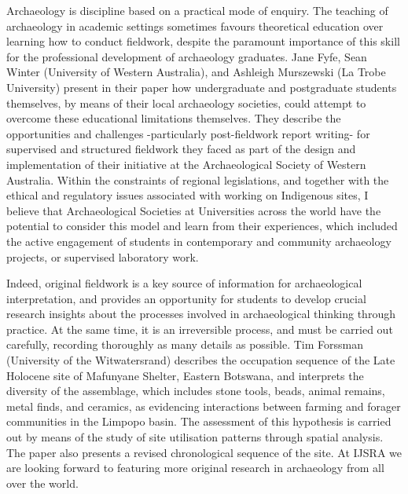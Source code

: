 Archaeology is discipline based on a practical mode of enquiry. The teaching of archaeology in academic settings sometimes favours theoretical education over learning how to conduct fieldwork, despite the paramount importance of this skill for the professional development of archaeology graduates. Jane Fyfe, Sean Winter (University of Western Australia), and Ashleigh Murszewski (La Trobe University) present in their paper how undergraduate and postgraduate students themselves, by means of their local archaeology societies, could attempt to overcome these educational limitations themselves. They describe the opportunities and challenges -particularly post-fieldwork report writing- for supervised and structured fieldwork they faced as part of the design and implementation of their initiative at the Archaeological Society of Western Australia. Within the constraints of regional legislations, and together with the ethical and regulatory issues associated with working on Indigenous sites, I believe that Archaeological Societies at Universities across the world have the potential to consider this model and learn from their experiences, which included the active engagement of students in contemporary and community archaeology projects, or supervised laboratory work.

Indeed, original fieldwork is a key source of information for archaeological interpretation, and provides an opportunity for students to develop crucial research insights about the processes involved in archaeological thinking through practice. At the same time, it is an irreversible process, and must be carried out carefully, recording thoroughly as many details as possible. Tim Forssman (University of the Witwatersrand) describes the occupation sequence of the Late Holocene site of Mafunyane Shelter, Eastern Botswana, and interprets the diversity of the assemblage, which includes stone tools, beads, animal remains, metal finds, and ceramics, as evidencing interactions between farming and forager communities in the Limpopo basin. The assessment of this hypothesis is carried out by means of the study of site utilisation patterns through spatial analysis. The paper also presents a revised chronological sequence of the site. At IJSRA we are looking forward to featuring more original research in archaeology from all over the world. 

